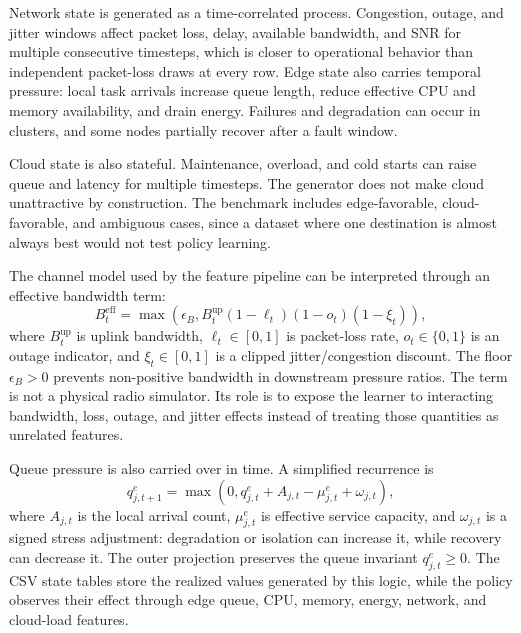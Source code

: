 Network state is generated as a time-correlated process. Congestion, outage, and jitter windows affect packet loss, delay, available bandwidth, and SNR for multiple consecutive timesteps, which is closer to operational behavior than independent packet-loss draws at every row. Edge state also carries temporal pressure: local task arrivals increase queue length, reduce effective CPU and memory availability, and drain energy. Failures and degradation can occur in clusters, and some nodes partially recover after a fault window.

Cloud state is also stateful. Maintenance, overload, and cold starts can raise queue and latency for multiple timesteps. The generator does not make cloud unattractive by construction. The benchmark includes edge-favorable, cloud-favorable, and ambiguous cases, since a dataset where one destination is almost always best would not test policy learning.

The channel model used by the feature pipeline can be interpreted through an effective bandwidth term:
\begin{equation}
B^{\mathrm{eff}}_t =
\max\left(\epsilon_B,
B^{\mathrm{up}}_t(1-\ell_t)(1-o_t)(1-\xi_t)\right),
\label{eq:effective_bandwidth}
\end{equation}
where $B^{\mathrm{up}}_t$ is uplink bandwidth, $\ell_t\in[0,1]$ is packet-loss rate, $o_t\in\{0,1\}$ is an outage indicator, and $\xi_t\in[0,1]$ is a clipped jitter/congestion discount. The floor $\epsilon_B>0$ prevents non-positive bandwidth in downstream pressure ratios. The term is not a physical radio simulator. Its role is to expose the learner to interacting bandwidth, loss, outage, and jitter effects instead of treating those quantities as unrelated features.

Queue pressure is also carried over in time. A simplified recurrence is
\begin{equation}
q^e_{j,t+1} =
\max\left(0, q^e_{j,t} + A_{j,t} - \mu^e_{j,t} + \omega_{j,t}\right),
\label{eq:queue_carryover}
\end{equation}
where $A_{j,t}$ is the local arrival count, $\mu^e_{j,t}$ is effective service capacity, and $\omega_{j,t}$ is a signed stress adjustment: degradation or isolation can increase it, while recovery can decrease it. The outer projection preserves the queue invariant $q^e_{j,t}\geq0$. The CSV state tables store the realized values generated by this logic, while the policy observes their effect through edge queue, CPU, memory, energy, network, and cloud-load features.


